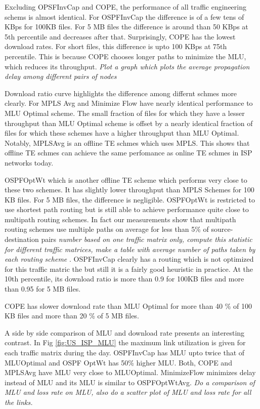\documentclass[a4paper,10pt]{article}
\begin{document}
Excluding OPSFInvCap and COPE, the performance of all traffic engineering schems is almost identical. For OSPFInvCap the difference is of a few tens of KBps for 100KB files. For 5 MB files the difference is around than 50 KBps at 5th percentile and decreases after that. Surprisingly, COPE has the lowest download rates.  For short files, this difference is upto 100 KBps at 75th percentile. This is because COPE chooses longer paths to minimize the MLU, which reduces its throughput. \emph{Plot a graph which plots the average propagation delay among different pairs of nodes}

Download ratio curve highlights the difference among differnt schmes more clearly. For MPLS Avg and Minimize Flow have nearly identical performance to MLU Optimal scheme. The small fraction of files for which they have a lesser throughput than MLU Optimal scheme is offset by a nearly identical fraction of files for which these schemes have a higher throughput than MLU Optimal. Notably, MPLSAvg is an offline TE schmes which uses MPLS. This shows that offline TE schmes can achieve the same perfomance as online TE schmes in ISP networks today. 

OSPFOptWt which is another offline TE scheme which performs very close to these two schemes. It has slightly lower throughput than MPLS Schemes for 100 KB files. For 5 MB files, the difference is negligible. OSPFOptWt is restricted to use shortest path routing but is still able to achieve performance quite close to multipath routing schemes. In fact our measurements show that multipath routing schemes use multiple paths on average for less than 5\% of source-destination pairs \emph{number based on one traffic matrix only, compute this statistic for different traffic matrices, make a table with average number of paths taken by each routing scheme }. OSPFInvCap clearly has a routing which is not optimized for this traffic matric the but still it is a fairly good heuristic in practice. At the 10th percentile, its download ratio is more than 0.9 for 100KB files and more than 0.95 for 5 MB files. 

COPE has slower download rate than MLU Optimal for more than 40 \% of 100 KB files and more than 20 \% of 5 MB files. 

A side by side comparison of MLU and download rate presents an interesting contrast. In Fig \ref{fig:US_ISP_MLU} the maximum link utilization is given for each traffic matrix during the day. OSPFInvCap has MLU upto twice that of MLUOptimal and OSPF OptWt has 50\% higher MLU. Both, COPE and MPLSAvg have MLU very close to MLUOptimal. MinimizeFlow minimizes delay instead of MLU and its MLU is similar to OSPFOptWtAvg.  \emph{Do a comparison of MLU and loss rate on MLU, also do a scatter plot of MLU and loss rate for all the links.}
\end{document}
